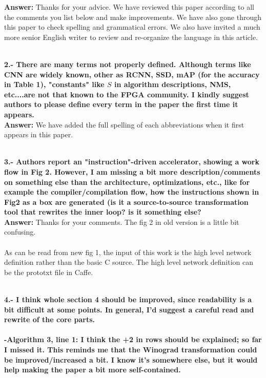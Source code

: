 \documentclass[12pt]{paper}
\newcommand{\rev}[1]{{{\color[rgb]{0,0,1}{#1}}}}
\newcommand{\answer}[1]{\noindent\textbf{Answer:} #1}
\newcommand{\comment}[1]{\noindent\textbf{\\ #1}\\}
\begin{document}
\answer{Thanks for your advice. We have reviewed this paper according to all the comments you list below and make improvements. We have also gone through this paper to check spelling and grammatical errors. We also have invited a much more senior English writer to review and re-organize the language in this article.}

\comment{2.- There are many terms not properly defined. Although terms like CNN are widely known, other as RCNN, SSD, mAP (for the accuracy in Table 1), "constants" like $S$ in algorithm descriptions, NMS, etc....are not that known to the FPGA community. I kindly suggest authors to please define every term in the paper the first time it appears.}

\answer{We have added the full spelling of each abbreviations when it first appears in this paper.
}
\rev{\\In Section 2, we have added the full spelling of RCNN, YOLO and SSD when they first appear. We have added a paragraph to introduce the evaluation of an image detection algorithm. The evaluating indicator is Mean Average Precision(mAP). In Section 4, the $S$ in the code stands for stride. To make it easier to understand, we set the $S$ to 1 in this article.
}

\comment{3.- Authors report an "instruction"-driven accelerator, showing a work flow in Fig 2. However, I am missing a bit more description/comments on something else than the architecture, optimizations, etc., like for example the compiler/compilation flow, how the instructions shown in Fig2 as a box are generated (is it a source-to-source transformation tool that rewrites the inner loop? is it something else? }

\answer{Thanks for your comments. The fig 2 in old version is a little bit confusing.\\
}
\rev{We have now replace the fig.2 in old version with the fig.1 in new version. Because the old fig 2 describes the workflow of this paper, we place the description of our workflow at the beginning of this article(Section 1).}
{\\As can be read from new fig 1, the input of this work is the high level network definition rather than the  basic C source. The high level network definition can be the prototxt file in Caffe.
}

\comment{4.- I think whole section 4 should be improved, since readability is a bit difficult at some points. In general, I'd suggest a careful read and rewrite of the core parts. }
\comment{-Algorithm 3, line 1: I think the +2 in rows should be explained; so far I missed it. This reminds me that the Winograd transformation could be improved/increased a bit. I know it's somewhere else, but it would help making the paper a bit more self-contained.  }
\end{document}
